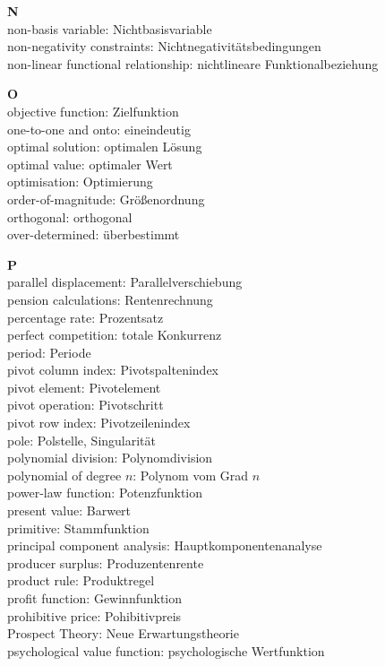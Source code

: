 \medskip
\noindent
{\bf N}\\
non-basis variable: Nichtbasisvariable\\
non-negativity constraints: Nichtnegativit\"atsbedingungen\\
non-linear functional relationship: nichtlineare 
Funktionalbeziehung

\medskip
\noindent
{\bf O}\\
objective function: Zielfunktion\\
one-to-one and onto: eineindeutig\\
optimal solution: optimalen L\"osung\\
optimal value: optimaler Wert\\
optimisation: Optimierung\\
order-of-magnitude: Gr\"o\ss enordnung\\
orthogonal: orthogonal\\
over-determined: \"{u}berbestimmt

\medskip
\noindent
{\bf P}\\
parallel displacement: Parallelverschiebung\\
pension calculations: Rentenrechnung\\
percentage rate: Prozentsatz\\
perfect competition: totale Konkurrenz\\
period: Periode\\
pivot column index: Pivotspaltenindex\\
pivot element: Pivotelement\\
pivot operation: Pivotschritt\\
pivot row index: Pivotzeilenindex\\
pole: Polstelle, Singularit\"at\\
polynomial division: Polynomdivision\\
polynomial of degree $n$: Polynom vom Grad $n$\\
power-law function: Potenzfunktion\\
present value: Barwert\\
primitive: Stammfunktion\\
principal component analysis: Hauptkomponentenanalyse\\
producer surplus: Produzentenrente\\
product rule: Produktregel\\
profit function: Gewinnfunktion\\
prohibitive price: Pohibitivpreis\\
Prospect Theory: Neue Erwartungstheorie\\
psychological value function: psychologische Wertfunktion

